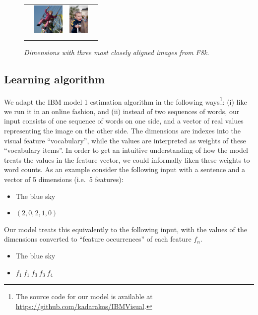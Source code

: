 \begin{figure}
\begin{tabular}{c|lll}
     & \includegraphics[height=1.5cm]{chapters/TAL/flickr8k/3504940491_94c43792ed.jpg}
     & \includegraphics[height=1.5cm]{chapters/TAL/flickr8k/3751594676_edfbfa0688.jpg}
     \\
     & & & \\
     \hline
   \end{tabular}
   \caption{\textit{Dimensions with three most closely aligned images from F8k.}}
   \label{fig:dims}
 \end{figure}


 \subsection{Learning algorithm}
 We adapt the IBM model 1 estimation algorithm in the following
 ways\footnote{The source code for our model is available at
   \url{https://github.com/kadarakos/IBMVisual}.}: (i) like
 \cite{fazly.etal.10csj} we run it in an online fashion, and (ii)
 instead of two sequences of words, our input consists of one sequence
 of words on one side, and a vector of real values representing the
 image on the other side. The dimensions are indexes into the visual
 feature ``vocabulary'', while the values are interpreted as weights
 of these ``vocabulary items''. In order to get an intuitive
 understanding of how the model treats the values in the feature
 vector, we could informally liken these weights to word counts.  As
 an example consider the following input with a sentence and a vector
 of 5 dimensions (i.e.\ 5 features):
\begin{itemize}
\item The blue sky
\item $(2, 0, 2, 1, 0)$
\end{itemize}
Our model treats this equivalently to the following input, with the
values of the dimensions converted to ``feature occurrences'' of each
feature $f_n$.
\begin{itemize}
\item The blue sky
\item $f_1~f_1~f_3~f_3~f_4$
\end{itemize}

